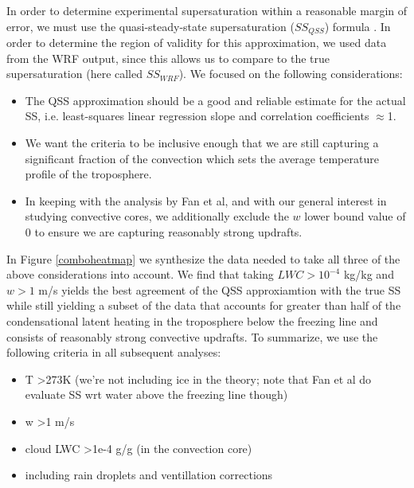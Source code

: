 \documentclass{article}
\begin{document}
In order to determine experimental supersaturation within a reasonable margin of error, we must use the quasi-steady-state supersaturation ($SS_{QSS}$) formula \cite{Rogers1989}. In order to determine the region of validity for this approximation, we used data from the WRF output, since this allows us to compare to the true supersaturation (here called $SS_{WRF}$). We focused on the following considerations:
\begin{itemize}
\item The QSS approximation should be a good and reliable estimate for the actual SS, i.e. least-squares linear regression slope and correlation coefficients $\approx$1.  
\item We want the criteria to be inclusive enough that we are still capturing a significant fraction of the convection which sets the average temperature profile of the troposphere.
\item In keeping with the analysis by Fan et al, and with our general interest in studying convective cores, we additionally exclude the $w$ lower bound value of 0 to ensure we are capturing reasonably strong updrafts. 
\end{itemize}
In Figure \ref{comboheatmap} we synthesize the data needed to take all three of the above considerations into account. We find that taking $LWC > 10^{-4}$ kg/kg and $w>1$ m/s yields the best agreement of the QSS approxiamtion with the true SS while still yielding a subset of the data that accounts for greater than half of the condensational latent heating in the troposphere below the freezing line and consists of reasonably strong convective updrafts. To summarize, we use the following criteria in all subsequent analyses:
\begin{itemize}
	\item T \textgreater  273K (we're not including ice in the theory; note that Fan et al do evaluate SS wrt water above the freezing line though)
	\item w \textgreater  1 m/s
	\item cloud LWC \textgreater  1e-4 g/g (in the convection core) 
	\item including rain droplets and ventillation corrections
\end{itemize}
\end{document}
